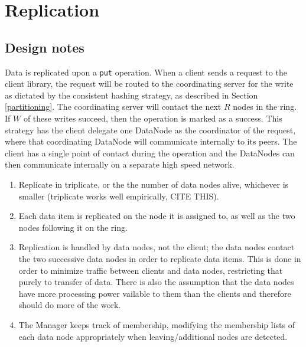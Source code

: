 \documentclass[paper=a4,fontsize=11pt]{report} %
\numberwithin{equation}{section} %
\numberwithin{figure}{section} %
\numberwithin{table}{section} %
\begin{document}
\section{Replication}
\subsection{Design notes}
Data is replicated upon a \texttt{put} operation. When a client sends a request to the client library, the request will be routed to the coordinating server for the write as dictated by the consistent hashing strategy, as described in Section \ref{partitioning}. The coordinating server will contact the next $R$ nodes in the ring. If $W$ of these writes succeed, then the operation is marked as a success. This strategy has the client delegate one DataNode as the coordinator of the request, where that coordinating DataNode will communicate internally to its peers. The client has a single point of contact during the operation and the DataNodes can then communicate internally on a separate high speed network.

\begin{enumerate}
\item Replicate in triplicate, or the the number of data nodes alive, whichever is smaller (triplicate works well empirically, CITE THIS).
\item Each data item is replicated on the node it is assigned to, as well as the two nodes following it on the ring.
\item Replication is handled by data nodes, not the client; the data nodes contact the two successive data nodes in order to replicate data items. This is done in order to minimize traffic between clients and data nodes, restricting that purely to transfer of data. There is also the assumption that the data nodes have more processing power vailable to them than the clients and therefore should do more of the work.
\item The Manager keeps track of membership, modifying the membership lists of each data node appropriately when leaving/additional nodes are detected.
\end{enumerate}
\end{document}
